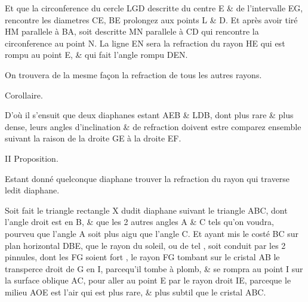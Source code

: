 \documentclass[11pt,a4paper]{article}
\begin{document}
Et que la circonference du cercle LGD descritte du centre E \& de l'intervalle EG, rencontre les diametres  CE, BE prolongez aux points L \& D. Et après avoir tiré HM parallele \struck{\ill{}} à BA, soit descritte MN parallele à CD qui rencontre la circonference au point N. La ligne EN sera la refraction du rayon HE qui est rompu au point E, \& qui fait l'angle rompu DEN.

On trouvera de la mesme façon \struck{\ill{}} la refraction de tous les autres rayons.

Corollaire.

D'où il s'ensuit que deux diaphanes estant  AEB \& LDB, dont \ill{} plus rare \&  plus dense, leurs angles d'inclination \& de refraction doivent estre comparez ensemble suivant la raison \struck{\ill{}} de la droite GE à la droite EF.

II Proposition.

Estant donné quelconque diaphane trouver la refraction du rayon qui traverse \ill{} ledit diaphane.

Soit fait le triangle rectangle X  dudit diaphane suivant le triangle ABC, dont l'angle droit est en B, \& que les 2 autres angles A \& C  tels qu'on voudra, pourveu que l'angle A soit plus aigu que l'angle C. Et ayant mis le costé BC sur \struck{\ill{}}  plan horizontal DBE, que le rayon du soleil, ou de tel \ill{}, soit conduit par les 2 pinnules, dont les  FG soient fort \ill{}, le rayon FG \struck{\ill{}} tombant sur le cristal AB le transperce droit de G en I, parcequ'il \struck{\ill{}} tombe à plomb, \& se rompra au point I sur la surface oblique AC, pour aller au point E par le rayon droit IE, parceque le milieu AOE est l'air qui est plus rare, \& plus subtil que le cristal ABC.
\end{document}
